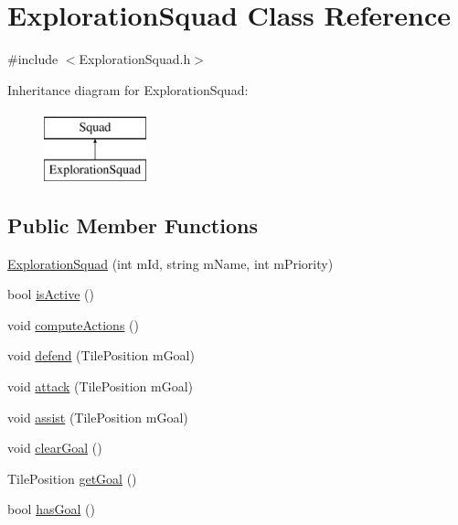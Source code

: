 \hypertarget{class_exploration_squad}{\section{Exploration\-Squad Class Reference}
\label{class_exploration_squad}
}


{\ttfamily \#include $<$Exploration\-Squad.\-h$>$}

Inheritance diagram for Exploration\-Squad\-:\begin{figure}[H]
\begin{center}
\leavevmode
\includegraphics[height=2.000000cm]{class_exploration_squad}
\end{center}
\end{figure}
\subsection*{Public Member Functions}
\begin{DoxyCompactItemize}
\item 
\hyperlink{class_exploration_squad_a1a8ab50930f73ead01cf6d140702a3e6}{Exploration\-Squad} (int m\-Id, string m\-Name, int m\-Priority)
\item 
bool \hyperlink{class_exploration_squad_adb1005691867354e7b7e2cfdf3ebf8e0}{is\-Active} ()
\item 
void \hyperlink{class_exploration_squad_a92828cacd3f8cb0264adec349a79c5ed}{compute\-Actions} ()
\item 
void \hyperlink{class_exploration_squad_a2be2429079224683d1ec0d79df52183b}{defend} (Tile\-Position m\-Goal)
\item 
void \hyperlink{class_exploration_squad_a99a16a1b2c08deb17563da4091998817}{attack} (Tile\-Position m\-Goal)
\item 
void \hyperlink{class_exploration_squad_a472ae48b827a94bad7caa49d2ab6dcdc}{assist} (Tile\-Position m\-Goal)
\item 
void \hyperlink{class_exploration_squad_a39e8e4ec023d86497016cc8091cd4005}{clear\-Goal} ()
\item 
Tile\-Position \hyperlink{class_exploration_squad_acfaa545346de257ac70fdcd7b2bb188f}{get\-Goal} ()
\item 
bool \hyperlink{class_exploration_squad_a0ad5867fc889921fb849d5e33849a681}{has\-Goal} ()
\end{DoxyCompactItemize}

